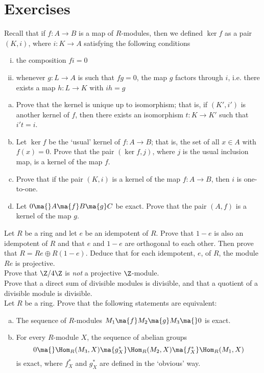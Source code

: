 \section{Exercises}

\prob Recall that if $f: A \to B$ is a map of $R$-modules, then we defined $\ker f$ as a pair $(K,i)$, where $i: K \to A$ satisfying the following conditions
	\begin{enumerate}[(i)]
	\item the composition $fi=0$
	\item whenever $g: L \to A$ is such that $fg=0$, the map $g$ factors through $i$, i.e. there exists a map $h: L \to K$ with $ih=g$
	\end{enumerate}
\begin{enumerate}[(a)]
\item Prove that the kernel is unique up to isomorphism; that is, if $(K',i')$ is another kernel of $f$, then there exists an isomorphism $t: K \to K'$ such that $i't=i$.
\item Let $\ker f$ be the `usual' kernel of $f: A \to B$; that is, the set of all $x \in A$ with $f(x)=0$. Prove that the pair $(\ker f,j)$, where $j$ is the usual inclusion map, is a kernel of the map $f$.
\item Prove that if the pair $(K,i)$ is a kernel of the map $f: A \to B$, then $i$ is one-to-one.
\item Let $0 \ma{} A \ma{f} B \ma{g} C$ be exact. Prove that the pair $(A,f)$ is a kernel of the map $g$. \\
\end{enumerate}


\prob Let $R$ be a ring and let $e$ be an idempotent of $R$. Prove that $1-e$ is also an idempotent of $R$ and that $e$ and $1-e$ are orthogonal to each other. Then prove that $R= Re \oplus R(1-e)$. Deduce that for each idempotent, $e$, of $R$, the module $Re$ is projective. \\


\prob Prove that $\Z/4\Z$ is \emph{not} a projective $\Z$-module. \\


\prob Prove that a direct sum of divisible modules is divisible, and that a quotient of a divisible module is divisible. \\


\prob Let $R$ be a ring. Prove that the following statements are equivalent:
	\begin{enumerate}[(a)]
	\item The sequence of $R$-modules $M_1 \ma{f} M_2 \ma{g} M_3 \ma{} 0$ is exact. 
	\item For every $R$-module $X$, the sequence of abelian groups
		\[
		0 \ma{} \Hom_R(M_3,X) \ma{g_X^*} \Hom_R(M_2,X) \ma{f_X^*} \Hom_R(M_1,X)
		\]
	is exact, where $f_X^*$ and $g_X^*$ are defined in the `obvious' way. \\
	\end{enumerate}


